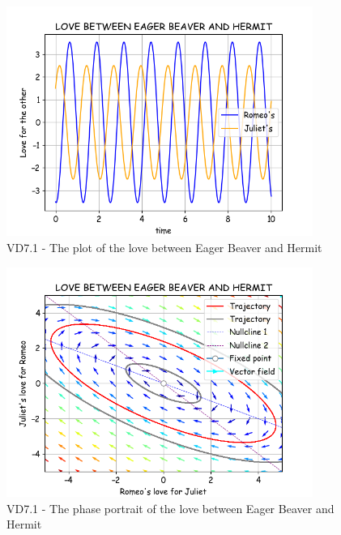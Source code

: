\begin{figure}[!htbp]
    \centering
    \includegraphics[width=100mm]{image/bt2/plot7.1.png}
    \caption{VD7.1 - The plot of the love between Eager Beaver and Hermit}
\end{figure}
\begin{figure}[!htbp]
    \centering
    \includegraphics[width=100mm]{image/bt2/pp7.1.png}
    \caption{VD7.1 - The phase portrait of the love between Eager Beaver and Hermit}
\end{figure}

